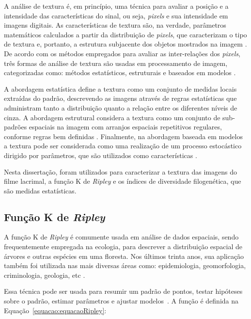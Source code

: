 A análise de textura é, em princípio, uma técnica para avaliar a posição e a intensidade das características do sinal, ou seja, \textit{pixels} e sua intensidade em imagens digitais. As características de textura são, na verdade, parâmetros matemáticos calculados a partir da distribuição de \textit{pixels}, que caracterizam o tipo de textura e, portanto, a estrutura subjacente dos objetos mostrados na imagem \cite{CASTELLANO20041061}. De acordo com os métodos empregados para avaliar as inter-relações dos \textit{pixels}, três formas de análise de textura são usadas em processamento de imagem, categorizadas como: métodos estatísticos, estruturais e baseados em modelos \cite{gonzalez2010processamento}.

A abordagem estatística define a textura como um conjunto de medidas locais extraídas do padrão, descrevendo as imagens através de regras estatísticas que administram tanto a distribuição quanto a relação entre os diferentes níveis de cinza. A abordagem estrutural considera a textura como um conjunto de sub-padrões espaciais na imagem com arranjos espaciais repetitivos regulares, conforme regras bem definidas \cite{morais1999discriminaccao}. Finalmente, na abordagem baseada em modelos a textura pode ser considerada como uma realização de um processo estocástico dirigido por parâmetros, que são utilizados como características \cite{felipe2002utilizando}.

Nesta dissertação, foram utilizados para caracterizar a textura das imagens do filme lacrimal, a função K de \textit{Ripley} e os índices de diversidade filogenética, que são medidas estatísticas.

\subsection{Função K de \textit{Ripley}}
\label{sec:kripley}

A função K de \textit{Ripley} é comumente usada em análise de dados espaciais, sendo frequentemente empregada na ecologia, para descrever a distribuição espacial de árvores e outras espécies em uma floresta. Nos últimos trinta anos, sua aplicação também foi utilizada nas mais diversas áreas como: epidemiologia, geomorfologia, criminologia, geologia, etc \cite{lancaster2004spatial}.

Essa técnica pode ser usada para resumir um padrão de pontos, testar hipóteses sobre o padrão, estimar parâmetros e ajustar modelos~\cite{ripley1977modelling}. A função é definida na Equação~\ref{equacao:equacaoRipley}:

